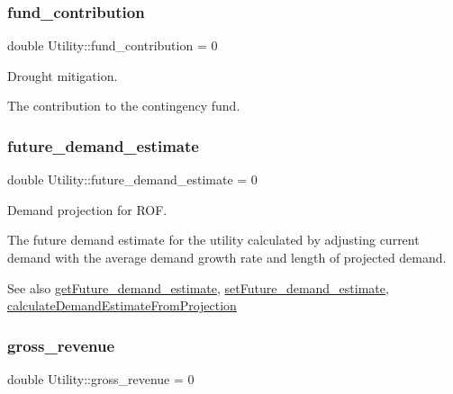 \subsubsection{\texorpdfstring{fund\+\_\+contribution}{fund\_contribution}}
{\footnotesize\ttfamily double Utility\+::fund\+\_\+contribution = 0\hspace{0.3cm}{\ttfamily [private]}}



Drought mitigation. 

The contribution to the contingency fund. \mbox{\label{classUtility_ad7ff0fe8ac967ccc347369778dbca076}} 
\subsubsection{\texorpdfstring{future\+\_\+demand\+\_\+estimate}{future\_demand\_estimate}}
{\footnotesize\ttfamily double Utility\+::future\+\_\+demand\+\_\+estimate = 0\hspace{0.3cm}{\ttfamily [private]}}



Demand projection for R\+OF. 

The future demand estimate for the utility calculated by adjusting current demand with the average demand growth rate and length of projected demand. \begin{DoxySeeAlso}{See also}
\mbox{\hyperlink{classUtility_a9ca028b10b1c466e010dcacca6a0b24e}{get\+Future\+\_\+demand\+\_\+estimate}}, \mbox{\hyperlink{classUtility_aa465673857827435f256bde97d36b77d}{set\+Future\+\_\+demand\+\_\+estimate}}, \mbox{\hyperlink{classUtility_a10f96b2f34ba7e6e12a8e8fb98b8534a}{calculate\+Demand\+Estimate\+From\+Projection}} 
\end{DoxySeeAlso}
\mbox{\label{classUtility_ac924f01dbdcc3160c2543b96d8849701}} 
\subsubsection{\texorpdfstring{gross\+\_\+revenue}{gross\_revenue}}
{\footnotesize\ttfamily double Utility\+::gross\+\_\+revenue = 0\hspace{0.3cm}{\ttfamily [private]}}



